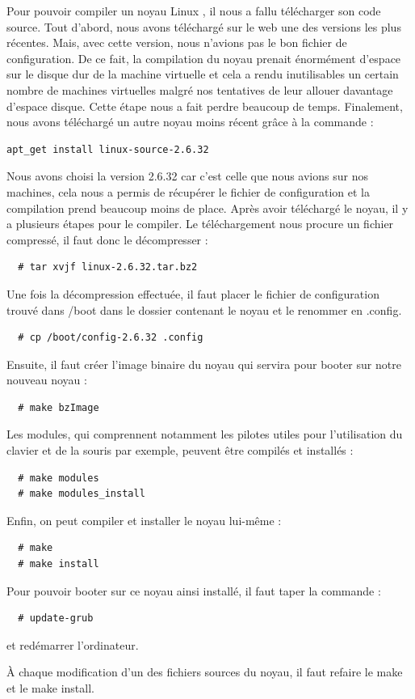 \documentclass[a4paper]{article}
\begin{document}
Pour pouvoir compiler un noyau Linux \cite{compil}, il nous a fallu télécharger son code source. 
Tout d'abord, nous avons téléchargé sur le web une des versions les plus récentes. 
Mais, avec cette version, nous n'avions pas le bon fichier de configuration. De ce fait, 
la compilation du noyau prenait énormément d'espace sur le disque dur de la machine virtuelle 
et cela a rendu inutilisables un certain nombre de machines virtuelles malgré nos tentatives 
de leur allouer davantage d'espace disque. Cette étape nous a fait perdre beaucoup de temps.
Finalement, nous avons téléchargé un autre noyau moins récent grâce à la commande :
\begin{verbatim}
apt_get install linux-source-2.6.32
\end{verbatim}
Nous avons choisi la version 2.6.32 car c'est celle que nous avions sur nos machines, 
cela nous a permis de récupérer le fichier de configuration et la compilation prend beaucoup moins de place.
Après avoir téléchargé le noyau, il y a plusieurs étapes pour le compiler. 
Le téléchargement nous procure un fichier compressé, il faut donc le décompresser :
\begin{verbatim}
  # tar xvjf linux-2.6.32.tar.bz2
\end{verbatim}
Une fois la décompression effectuée, il faut placer le fichier de configuration trouvé dans /boot dans le dossier contenant le noyau et le renommer en .config.
\begin{verbatim}
  # cp /boot/config-2.6.32 .config
\end{verbatim}
Ensuite, il faut créer l'image binaire du noyau qui servira pour booter sur notre nouveau noyau :
\begin{verbatim}
  # make bzImage
\end{verbatim}
Les modules, qui comprennent notamment les pilotes utiles pour l'utilisation du clavier et de la souris par exemple, peuvent être compilés et installés :
\begin{verbatim}
  # make modules
  # make modules_install
\end{verbatim}
Enfin, on peut compiler et installer le noyau lui-même :
\begin{verbatim}
  # make
  # make install
\end{verbatim}
Pour pouvoir booter sur ce noyau ainsi installé, il faut taper la commande :
\begin{verbatim}
  # update-grub
\end{verbatim}
et redémarrer l'ordinateur.

\`A chaque modification d'un des fichiers sources du noyau, il faut refaire le make et le make install.
\end{document}
